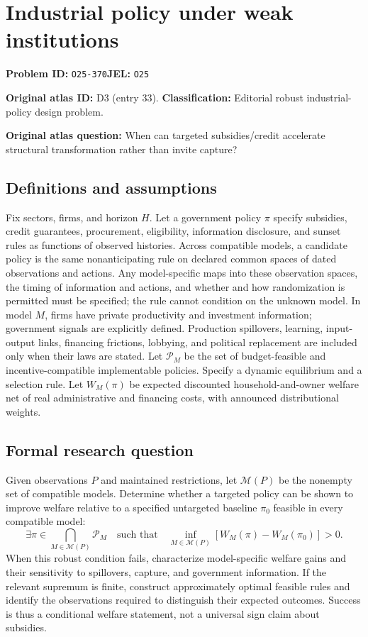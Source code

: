 \documentclass[11pt,a4paper]{article}
\begin{document}
\section*{Industrial policy under weak institutions}
\textbf{Problem ID:} \texttt{O25-370}\quad \textbf{JEL:} \texttt{O25}\par
\label{problem:OP-0033}
\label{atlas:prob:D3}
\noindent\textbf{Original atlas ID:} D3 (entry 33). \textbf{Classification:} Editorial robust industrial-policy design problem.

\noindent\textbf{Original atlas question:} When can targeted subsidies/credit accelerate structural transformation rather than invite capture?

\subsection*{Definitions and assumptions}
Fix sectors, firms, and horizon $H$. Let a government policy $\pi$ specify subsidies, credit guarantees, procurement, eligibility, information disclosure, and sunset rules as functions of observed histories. Across compatible models, a candidate policy is the same nonanticipating rule on declared common spaces of dated observations and actions. Any model-specific maps into these observation spaces, the timing of information and actions, and whether and how randomization is permitted must be specified; the rule cannot condition on the unknown model. In model $M$, firms have private productivity and investment information; government signals are explicitly defined. Production spillovers, learning, input-output links, financing frictions, lobbying, and political replacement are included only when their laws are stated. Let $\mathcal P_M$ be the set of budget-feasible and incentive-compatible implementable policies. Specify a dynamic equilibrium and a selection rule. Let $W_M(\pi)$ be expected discounted household-and-owner welfare net of real administrative and financing costs, with announced distributional weights.
\subsection*{Formal research question}
Given observations $P$ and maintained restrictions, let $\mathcal M(P)$ be the nonempty set of compatible models. Determine whether a targeted policy can be shown to improve welfare relative to a specified untargeted baseline $\pi_0$ feasible in every compatible model:
\[
 \exists\pi\in\bigcap_{M\in\mathcal M(P)}\mathcal P_M
 \quad\text{such that}\quad
 \inf_{M\in\mathcal M(P)}[W_M(\pi)-W_M(\pi_0)]>0.
\]
When this robust condition fails, characterize model-specific welfare gains and their sensitivity to spillovers, capture, and government information. If the relevant supremum is finite, construct approximately optimal feasible rules and identify the observations required to distinguish their expected outcomes. Success is thus a conditional welfare statement, not a universal sign claim about subsidies.
\end{document}
